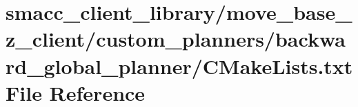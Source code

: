 \hypertarget{smacc__client__library_2move__base__z__client_2custom__planners_2backward__global__planner_2CMakeLists_8txt}{}\section{smacc\+\_\+client\+\_\+library/move\+\_\+base\+\_\+z\+\_\+client/custom\+\_\+planners/backward\+\_\+global\+\_\+planner/\+C\+Make\+Lists.txt File Reference}
\label{smacc__client__library_2move__base__z__client_2custom__planners_2backward__global__planner_2CMakeLists_8txt}

